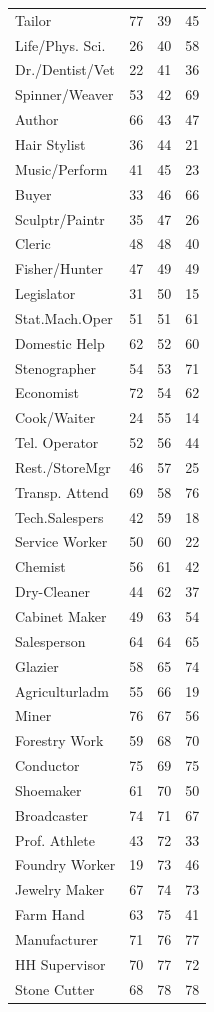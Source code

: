 \begin{tabular}{lccc}
Tailor&77&39&45\\
Life/Phys. Sci.&26&40&58\\
Dr./Dentist/Vet&22&41&36\\
Spinner/Weaver&53&42&69\\
Author&66&43&47\\
Hair Stylist&36&44&21\\
Music/Perform&41&45&23\\
Buyer&33&46&66\\
Sculptr/Paintr&35&47&26\\
Cleric&48&48&40\\
Fisher/Hunter&47&49&49\\
Legislator&31&50&15\\
Stat.Mach.Oper&51&51&61\\
Domestic Help&62&52&60\\
Stenographer&54&53&71\\
Economist&72&54&62\\
Cook/Waiter&24&55&14\\
Tel. Operator&52&56&44\\
Rest./StoreMgr&46&57&25\\
Transp. Attend&69&58&76\\
Tech.Salespers&42&59&18\\
Service Worker&50&60&22\\
Chemist&56&61&42\\
Dry-Cleaner&44&62&37\\
Cabinet Maker&49&63&54\\
Salesperson&64&64&65\\
Glazier&58&65&74\\
Agriculturladm&55&66&19\\
Miner&76&67&56\\
Forestry Work&59&68&70\\
Conductor&75&69&75\\
Shoemaker&61&70&50\\
Broadcaster&74&71&67\\
Prof. Athlete&43&72&33\\
Foundry Worker&19&73&46\\
Jewelry Maker&67&74&73\\
Farm Hand&63&75&41\\
Manufacturer&71&76&77\\
HH Supervisor&70&77&72\\
Stone Cutter&68&78&78\\
\hline\hline
\end{tabular}
